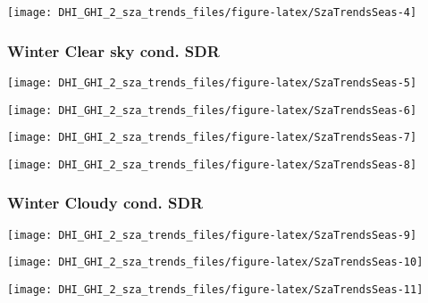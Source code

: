 \documentclass[
  10pt,
  a4paper,oneside]{article}
\begin{document}
\begin{center}\texttt{[image: DHI\_GHI\_2\_sza\_trends\_files/figure-latex/SzaTrendsSeas-4]} \end{center}

\newpage

\hypertarget{winter-clear-sky-cond.-sdr}{%
\subsubsection{Winter Clear sky cond. SDR}\label{winter-clear-sky-cond.-sdr}}

\begin{center}\texttt{[image: DHI\_GHI\_2\_sza\_trends\_files/figure-latex/SzaTrendsSeas-5]} \end{center}

\begin{center}\texttt{[image: DHI\_GHI\_2\_sza\_trends\_files/figure-latex/SzaTrendsSeas-6]} \end{center}

\begin{center}\texttt{[image: DHI\_GHI\_2\_sza\_trends\_files/figure-latex/SzaTrendsSeas-7]} \end{center}

\begin{center}\texttt{[image: DHI\_GHI\_2\_sza\_trends\_files/figure-latex/SzaTrendsSeas-8]} \end{center}

\newpage

\hypertarget{winter-cloudy-cond.-sdr}{%
\subsubsection{Winter Cloudy cond. SDR}\label{winter-cloudy-cond.-sdr}}

\begin{center}\texttt{[image: DHI\_GHI\_2\_sza\_trends\_files/figure-latex/SzaTrendsSeas-9]} \end{center}

\begin{center}\texttt{[image: DHI\_GHI\_2\_sza\_trends\_files/figure-latex/SzaTrendsSeas-10]} \end{center}

\begin{center}\texttt{[image: DHI\_GHI\_2\_sza\_trends\_files/figure-latex/SzaTrendsSeas-11]} \end{center}
\end{document}
